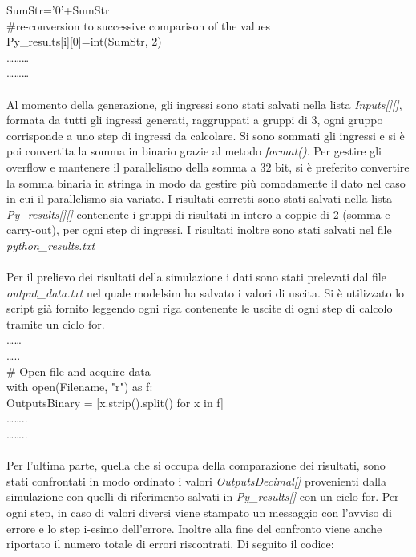 SumStr='0'+SumStr\\
\#re-conversion to successive comparison of the values\\
Py\_results[i][0]=int(SumStr, 2)\\  
………\\
………\\
\\
Al momento della generazione, gli ingressi sono stati salvati nella lista \textit{Inputs[][]}, formata da tutti gli ingressi  generati, raggruppati a gruppi di 3, ogni gruppo corrisponde a uno step di ingressi da calcolare. Si sono sommati gli ingressi e si è poi convertita la somma in binario grazie al metodo \textit{format()}. Per gestire gli overflow e mantenere il parallelismo della somma a 32 bit, si è preferito convertire la somma binaria in stringa in modo da gestire più comodamente il dato nel caso in cui il parallelismo sia variato.
I risultati corretti sono stati salvati nella lista \textit{Py\_results[][]} contenente i gruppi di risultati in intero a coppie di 2 (somma e carry-out), per ogni step di ingressi. I risultati inoltre sono stati salvati nel file \textit{python\_results.txt}\\
\\
Per il prelievo dei risultati della simulazione i dati sono stati prelevati dal file \textit{output\_data.txt} nel quale modelsim ha salvato i valori di uscita. Si è utilizzato lo script già fornito leggendo ogni riga contenente le uscite di ogni step di calcolo tramite un ciclo for.\\ 
……\\
…..\\
\# Open file and acquire data\\
with open(Filename, "r") as f:\\
OutputsBinary = [x.strip().split() for x in f]\\
……..\\
……..\\
\\
Per l’ultima parte, quella che si occupa della comparazione dei risultati, sono stati confrontati in modo ordinato i valori \textit{OutputsDecimal[]} provenienti dalla simulazione con quelli di riferimento salvati in \textit{Py\_results[]} con un ciclo for. Per ogni step, in caso di valori diversi viene stampato un messaggio con l’avviso di errore e lo step i-esimo dell’errore. Inoltre alla fine del confronto viene anche riportato il numero totale di errori riscontrati. Di seguito il codice:\\
\\
